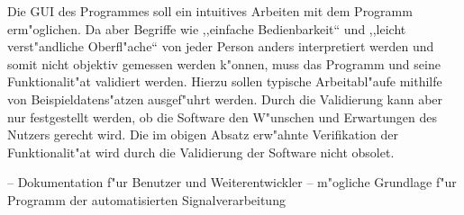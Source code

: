Die \ac{GUI} des Programmes soll ein intuitives Arbeiten mit dem Programm erm"oglichen.
Da aber Begriffe wie ,,einfache Bedienbarkeit`` und ,,leicht verst"andliche Oberfl"ache`` von jeder Person anders interpretiert werden und somit nicht objektiv gemessen werden k"onnen, muss das Programm und seine Funktionalit"at validiert werden.
Hierzu sollen typische Arbeitabl"aufe mithilfe von Beispieldatens"atzen ausgef"uhrt werden.
Durch die Validierung kann aber nur festgestellt werden, ob die Software den W"unschen und Erwartungen des Nutzers gerecht wird.
Die im obigen Absatz erw"ahnte Verifikation der Funktionalit"at wird durch die Validierung der Software nicht obsolet.


-- Dokumentation f"ur Benutzer und Weiterentwickler
-- m"ogliche Grundlage f"ur Programm der automatisierten Signalverarbeitung

